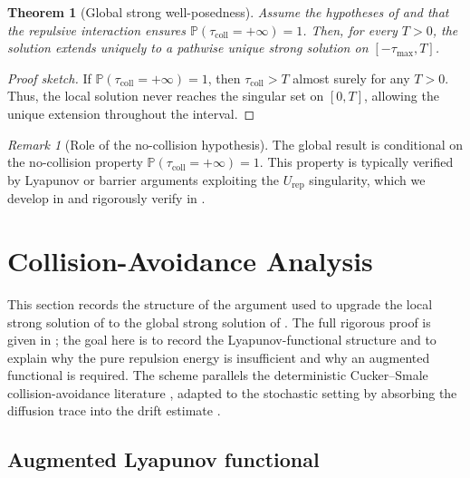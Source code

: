\documentclass[pdflatex,sn-mathphys-num]{sn-jnl}%
\numberwithin{equation}{section}
\theoremstyle{thmstyleone}%
\newtheorem{theorem}{Theorem}
\theoremstyle{remark}
\newtheorem{remark}{Remark}
\theoremstyle{definition}
\newcommand{\Prob}{\mathbb{P}}
\begin{document}
\begin{theorem}[Global strong well-posedness]\label{thm:global}
Assume the hypotheses of  and that the repulsive interaction
ensures $\Prob(\tau_{\mathrm{coll}}=+\infty)=1$. Then, for every $T>0$, the
solution extends uniquely to a pathwise unique strong solution on
$[-\tau_{\max},T]$.
\end{theorem}
\begin{proof}[Proof sketch]
If $\Prob(\tau_{\mathrm{coll}}=+\infty)=1$, then $\tau_{\mathrm{coll}}>T$
almost surely for any $T>0$. Thus, the local solution never reaches the
singular set on $[0,T]$, allowing the unique extension throughout the
interval.
\end{proof}
\begin{remark}[Role of the no-collision hypothesis]\label{rem:nocollision-role}
The global result is conditional on the no-collision property
$\Prob(\tau_{\mathrm{coll}}=+\infty)=1$. This property is typically verified
by Lyapunov or barrier arguments exploiting the $U_{\mathrm{rep}}$
singularity, which we develop in  and
rigorously verify in .
\end{remark}
\section{Collision-Avoidance Analysis}
\label{sec:collision-analysis}

This section records the structure of the argument used to upgrade the local
strong solution of  to the global strong solution of
. The full rigorous proof is given in
; the goal here is to record the
Lyapunov-functional structure and to explain why the pure repulsion energy
is insufficient and why an augmented functional is required. The
scheme parallels the deterministic Cucker--Smale collision-avoidance
literature \cite{cucker2010avoiding,park2010cucker,carrillo2017sharp},
adapted to the stochastic setting by absorbing the diffusion trace into the
drift estimate \cite{ha2009emergence,ahn2010stochastic}.

\subsection{Augmented Lyapunov functional}
\label{subsec:augmented-lyapunov}
\end{document}
